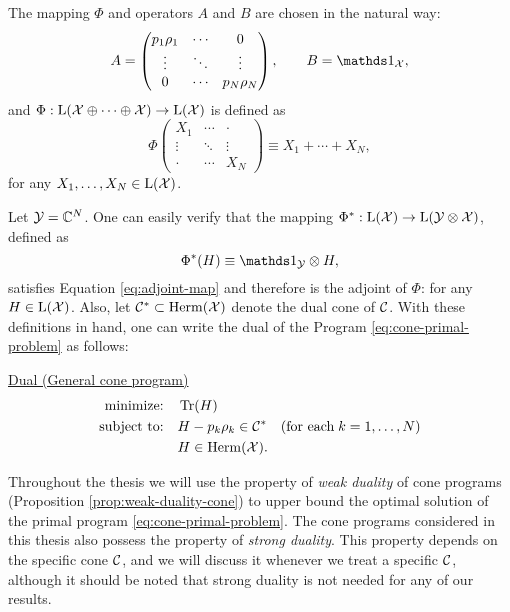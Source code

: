 The mapping $\Phi$ and operators $A$ and $B$ 
are chosen in the natural way:
\begin{equation}
  A = \begin{pmatrix}
    p_1 \rho_1 & \cdots & 0 \\
    \vdots & \ddots & \vdots\\
    0 & \cdots & p_N\rho_N
  \end{pmatrix},
  \qquad
  B = \I_{\X},
\end{equation}
and $\Phi : \mathrm{L}(\mathcal{X}\oplus\cdots\oplus\mathcal{X}) \rightarrow \mathrm{L}(\mathcal{X})$ is defined as 
\begin{equation}
  \Phi\begin{pmatrix}
  X_{1} & \cdots & \cdot \\
  \vdots & \ddots & \vdots\\
  \cdot & \cdots & X_{N}
  \end{pmatrix}
  \equiv X_{1}+\cdots+X_{N},
\end{equation}
for any $X_{1}, \ldots, X_{N} \in \mathrm{L}(\mathcal{X})$.

Let $\mathcal{Y} = \mathbb{C}^{N}$. One can easily verify that the mapping 
$\Phi^{\ast}: \mathrm{L}(\mathcal{X})\rightarrow\mathrm{L}(\mathcal{Y}\otimes\mathcal{X})$,
defined as  
\begin{equation}
  \Phi^{\ast}(H) \equiv \I_{\Y}\otimes H,
\end{equation}
satisfies Equation \eqref{eq:adjoint-map} and therefore is 
the adjoint of $\Phi$:
for any $H\in\mathrm{L}(\mathcal{X})$. 
Also, let $\mathcal{C}^{\ast} \subset \mathrm{Herm}(\mathcal{X})$ denote the dual cone of $\mathcal{C}$.
With these definitions in hand, one can write the dual of the Program 
\eqref{eq:cone-primal-problem} as follows:
\begin{center}
\underline{Dual (General cone program)}
\begin{equation}
  \label{eq:cone-dual-problem}
  \begin{split}
    \text{minimize:} \quad & \operatorname{Tr}(H)\\
    \text{subject to:} \quad & H-p_k\rho_k\in\mathcal{C}^{\ast}
    \quad(\text{for each}\;k = 1,\ldots,N)\\
    \quad & H \in \mathrm{Herm}(\mathcal{X}).
  \end{split}
\end{equation}
\end{center}

Throughout the thesis we will use the property of \emph{weak duality} of cone 
programs (Proposition \ref{prop:weak-duality-cone}) to upper bound the
optimal solution of the primal program \eqref{eq:cone-primal-problem}.
The cone programs considered in this thesis also possess the property 
of \emph{strong duality}. This property depends on the specific cone $\mathcal{C}$,
and we will discuss it whenever we treat a specific $\mathcal{C}$, although
it should be noted that strong duality is not needed for any of our results.

